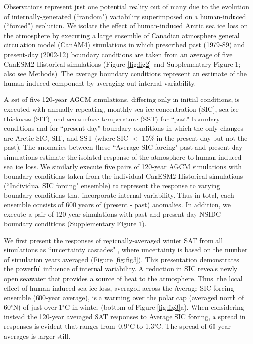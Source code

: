 \documentclass{nature}
\begin{document}

Observations represent just one potential reality out of many due to the evolution of internally-generated (``random") variability superimposed on a human-induced (``forced") evolution. We isolate the effect of human-induced Arctic sea ice loss on the atmosphere by executing a large ensemble of Canadian atmosphere general circulation model (CanAM4) simulations in which prescribed past (1979-89) and present-day (2002-12) boundary conditions are taken from an average of five CanESM2 Historical simulations (Figure \ref{fig:fig2} and Supplementary Figure 1; also see Methods). The average boundary conditions represent an estimate of the human-induced component by averaging out internal variability. 

A set of five 120-year AGCM simulations, differing only in initial conditions, is executed with annually-repeating, monthly sea-ice concentration (SIC), sea-ice thickness (SIT), and sea surface temperature (SST) for ``past" boundary conditions and for ``present-day" boundary conditions in which the only changes are Arctic SIC, SIT, and SST (where SIC $<$ 15\% in the present day but not the past). The anomalies between these ``Average SIC forcing" past and present-day simulations estimate the isolated response of the atmosphere to human-induced sea ice loss. We similarly execute five pairs of 120-year AGCM simulations with boundary conditions taken from the individual CanESM2 Historical simulations (``Individual SIC forcing" ensemble) to represent the response to varying boundary conditions that incorporate internal variability. Thus in total, each ensemble consists of 600 years of (present - past) anomalies. In addition, we execute a pair of 120-year simulations with past and present-day NSIDC boundary conditions (Supplementary Figure 1).

We first present the responses of regionally-averaged winter SAT from all simulations as ``uncertainty cascades" \cite{wilby10,swart15}, where uncertainty is based on the number of simulation years averaged (Figure \ref{fig:fig3}). This presentation demonstrates the powerful influence of internal variability. A reduction in SIC reveals newly open seawater that provides a source of heat to the atmosphere. Thus, the local effect of human-induced sea ice loss, averaged across the Average SIC forcing ensemble (600-year average), is a warming over the polar cap (averaged north of 60$^\circ$N) of just over 1$^\circ$C in winter (bottom of Figure \ref{fig:fig3}a). When considering instead the 120-year averaged SAT responses to Average SIC forcing, a spread in responses is evident that ranges from $~$0.9$^\circ$C to 1.3$^\circ$C. The spread of 60-year averages is larger still. 
\end{document}
